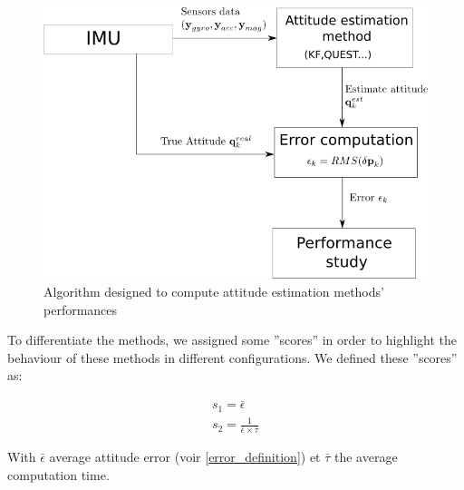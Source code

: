 \documentclass[twocolumn]{bmcart}
\begin{document}
\begin{figure}[!h]
\centering
\includegraphics[scale=0.40]{images/test_method.png}
\caption{Algorithm designed to compute attitude estimation methods' performances}
\label{test_method}
\end{figure}


To differentiate the methods, we assigned  some ''scores'' in order to highlight the behaviour of these methods in different configurations. We defined these ''scores'' as:

\begin{align}
s_1 = \bar{\epsilon}\\
s_2 = \frac{1}{\bar{\epsilon} \times \bar{\tau}}
\label{score}
\end{align}

With $\bar{\epsilon}$ average attitude error (voir \ref{error_definition}) et $\bar{\tau}$ the average computation time. \\
\end{document}
